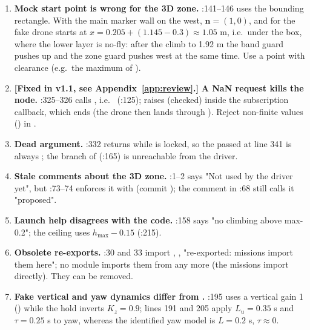 \begin{review}
\begin{enumerate}[leftmargin=*,itemsep=3pt]
\item \textbf{Mock start point is wrong for the 3D zone.} :141--146 uses the bounding rectangle.
With the main marker wall on the west, $\bm n=(1,0)$, and for  the fake drone starts at
$x = 0.205+(1.145-0.3) \approx 1.05$ m, i.e.\ under the  box, where the lower layer is
no-fly: after the climb to 1.92 m the band guard pushes up and the zone guard pushes west at the same time. Use a
point with clearance (e.g.\ the maximum of ).

\item \textcolor{OliveGreen}{\textbf{[Fixed in v1.1, see Appendix~\ref{app:review}.]}} \textbf{A NaN request kills the node.} :325--326 calls , i.e.\ 
(:125);  raises  (checked) inside the subscription
callback, which ends  (the drone then lands through ). Reject non-finite values
() in .

\item \textbf{Dead  argument.} :332 returns while  is locked, so the
 passed at line 341 is always ; the  branch of
 (:165) is unreachable from the driver.

\item \textbf{Stale comments about the 3D zone.} :1--2 says "Not used by the driver
yet", but :73--74 enforces it with  (commit ); the
comment in :68 still calls it "proposed".

\item \textbf{Launch help disagrees with the code.} :158 says "no climbing above max-0.2"; the
ceiling uses $h_{\max}-0.15$ (:215).

\item \textbf{Obsolete re-exports.} :30 and 33 import , ,
 "re-exported: missions import them here"; no module imports them from  any more (the
missions import  directly). They can be removed.

\item \textbf{Fake vertical and yaw dynamics differ from .} :195 uses a vertical
gain 1 () while the hold inverts $K_z=0.9$; lines 191 and 205 apply $L_u=0.35$ s and
$\tau=0.25$ s to yaw, whereas the identified yaw model is $L=0.2$ s, $\tau\approx0$.


\end{enumerate}
\end{review}
